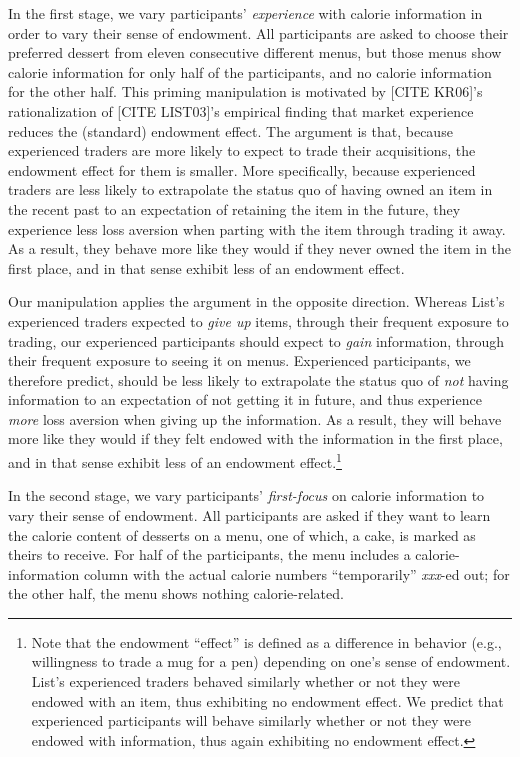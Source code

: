 \documentclass[12pt]{article}
\begin{document}
In the first stage, we vary participants’ \emph{experience} with calorie information in order to vary their sense of endowment. All participants are asked to choose their preferred dessert from eleven consecutive different menus, but those menus show calorie information for only half of the participants, and no calorie information for the other half. This priming manipulation is motivated by [CITE KR06]'s rationalization of [CITE LIST03]'s empirical finding that market experience reduces the (standard) endowment effect. The argument is that, because experienced traders are more likely to expect to trade their acquisitions, the endowment effect for them is smaller. More specifically, because experienced traders are less likely to extrapolate the status quo of having owned an item in the recent past to an expectation of retaining the item in the future, they experience less loss aversion when parting with the item through trading it away. As a result, they behave more like they would if they never owned the item in the first place, and in that sense exhibit less of an endowment effect.


Our manipulation applies the argument in the opposite direction. Whereas List’s experienced traders expected to \emph{give up} items, through their frequent exposure to trading, our experienced participants should expect to \emph{gain} information, through their frequent exposure to seeing it on menus. Experienced participants, we therefore predict, should be less likely to extrapolate the status quo of \emph{not} having information to an expectation of not getting it in future, and thus experience \emph{more} loss aversion when giving up the information. As a result, they will behave more like they would if they felt endowed with the information in the first place, and in that sense exhibit less of an endowment effect.\footnote{Note that the endowment \enquote{effect} is defined as a difference in behavior (e.g., willingness to trade a mug for a pen) depending on one’s sense of endowment. List’s experienced traders behaved similarly whether or not they were endowed with an item, thus exhibiting no endowment effect. We predict that experienced participants will behave similarly whether or not they were endowed with information, thus again exhibiting no endowment effect.}

In the second stage, we vary participants' \emph{first-focus} on calorie information to vary their sense of endowment. All participants are asked if they want to learn the calorie content of desserts on a menu, one of which, a cake, is marked as theirs to receive. For half of the participants, the menu includes a calorie-information column with the actual calorie numbers \enquote{temporarily} \emph{xxx}-ed out; for the other half, the menu shows nothing calorie-related.
\end{document}
